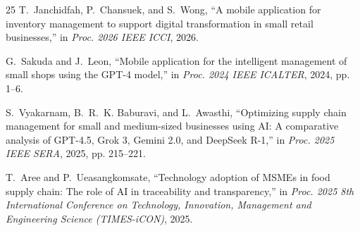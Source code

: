 \documentclass[conference]{IEEEtran}
\begin{document}
\begin{thebibliography}{25}
T.~Janchidfah, P.~Chansuek, and S.~Wong, ``A mobile application for inventory management to support digital transformation in small retail businesses,'' in \emph{Proc. 2026 IEEE ICCI}, 2026.

G.~Sakuda and J.~Leon, ``Mobile application for the intelligent management of small shops using the GPT-4 model,'' in \emph{Proc. 2024 IEEE ICALTER}, 2024, pp. 1--6.

S.~Vyakarnam, B.~R.~K. Baburavi, and L.~Awasthi, ``Optimizing supply chain management for small and medium-sized businesses using AI: A comparative analysis of GPT-4.5, Grok 3, Gemini 2.0, and DeepSeek R-1,'' in \emph{Proc. 2025 IEEE SERA}, 2025, pp. 215--221.

T.~Aree and P.~Ueasangkomsate, ``Technology adoption of MSMEs in food supply chain: The role of AI in traceability and transparency,'' in \emph{Proc. 2025 8th International Conference on Technology, Innovation, Management and Engineering Science (TIMES-iCON)}, 2025.

\end{thebibliography}
\end{document}
